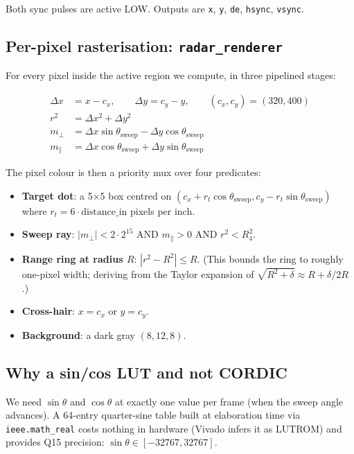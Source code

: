 \documentclass[11pt,a4paper]{article}
\begin{document}
Both sync pulses are active LOW.  Outputs are \texttt{x}, \texttt{y},
\texttt{de}, \texttt{hsync}, \texttt{vsync}.

\subsection{Per-pixel rasterisation: \texttt{radar\_renderer}}

For every pixel inside the active region we compute, in three pipelined
stages:

\begin{align*}
  \Delta x &= x - c_x, \qquad \Delta y = c_y - y, \qquad (c_x,c_y) = (320,400)\\
  r^2      &= \Delta x^2 + \Delta y^2 \\
  m_{\perp}    &= \Delta x \sin\theta_{\text{sweep}} - \Delta y \cos\theta_{\text{sweep}} \\
  m_{\parallel} &= \Delta x \cos\theta_{\text{sweep}} + \Delta y \sin\theta_{\text{sweep}}
\end{align*}

The pixel colour is then a priority mux over four predicates:

\begin{itemize}
  \item \textbf{Target dot}: a 5$\times$5 box centred on
        $(c_x + r_t \cos\theta_{\text{sweep}},
          c_y - r_t \sin\theta_{\text{sweep}})$ where
        $r_t = 6 \cdot \text{distance\_in}$ pixels per inch.
  \item \textbf{Sweep ray}: $|m_{\perp}| < 2 \cdot 2^{15}$ AND $m_{\parallel} > 0$
        AND $r^2 < R_4^2$.
  \item \textbf{Range ring at radius $R$}: $|r^2 - R^2| \leq R$.
        (This bounds the ring to roughly one-pixel width; deriving from
        the Taylor expansion of $\sqrt{R^2 + \delta} \approx R + \delta/2R$.)
  \item \textbf{Cross-hair}: $x = c_x$ or $y = c_y$.
  \item \textbf{Background}: a dark gray $(8,12,8)$.
\end{itemize}

\subsection{Why a sin/cos LUT and not CORDIC}

We need $\sin\theta$ and $\cos\theta$ at exactly one value per frame
(when the sweep angle advances).  A 64-entry quarter-sine table built
at elaboration time via \texttt{ieee.math\_real} costs nothing in
hardware (Vivado infers it as LUTROM) and provides Q15 precision:
$\sin\theta \in [-32767, 32767]$.
\end{document}
